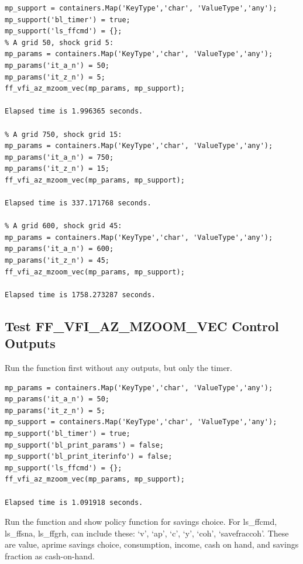 \documentclass[
]{book}
\begin{document}
\begin{verbatim}
mp_support = containers.Map('KeyType','char', 'ValueType','any');
mp_support('bl_timer') = true;
mp_support('ls_ffcmd') = {};
% A grid 50, shock grid 5:
mp_params = containers.Map('KeyType','char', 'ValueType','any');
mp_params('it_a_n') = 50;
mp_params('it_z_n') = 5;
ff_vfi_az_mzoom_vec(mp_params, mp_support);

Elapsed time is 1.996365 seconds.

% A grid 750, shock grid 15:
mp_params = containers.Map('KeyType','char', 'ValueType','any');
mp_params('it_a_n') = 750;
mp_params('it_z_n') = 15;
ff_vfi_az_mzoom_vec(mp_params, mp_support);

Elapsed time is 337.171768 seconds.

% A grid 600, shock grid 45:
mp_params = containers.Map('KeyType','char', 'ValueType','any');
mp_params('it_a_n') = 600;
mp_params('it_z_n') = 45;
ff_vfi_az_mzoom_vec(mp_params, mp_support);

Elapsed time is 1758.273287 seconds.
\end{verbatim}

\hypertarget{test-ff_vfi_az_mzoom_vec-control-outputs}{%
\subsection{Test FF\_VFI\_AZ\_MZOOM\_VEC Control Outputs}\label{test-ff_vfi_az_mzoom_vec-control-outputs}}

Run the function first without any outputs, but only the timer.

\begin{verbatim}
mp_params = containers.Map('KeyType','char', 'ValueType','any');
mp_params('it_a_n') = 50;
mp_params('it_z_n') = 5;
mp_support = containers.Map('KeyType','char', 'ValueType','any');
mp_support('bl_timer') = true;
mp_support('bl_print_params') = false;
mp_support('bl_print_iterinfo') = false;
mp_support('ls_ffcmd') = {};
ff_vfi_az_mzoom_vec(mp_params, mp_support);

Elapsed time is 1.091918 seconds.
\end{verbatim}

Run the function and show policy function for savings choice. For
ls\_ffcmd, ls\_ffsna, ls\_ffgrh, can include these: `v', `ap', `c', `y',
`coh', `savefraccoh'. These are value, aprime savings choice,
consumption, income, cash on hand, and savings fraction as cash-on-hand.
\end{document}
